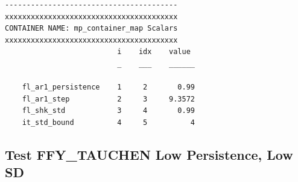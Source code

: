 \documentclass[
]{book}
\begin{document}
\begin{verbatim}
----------------------------------------
xxxxxxxxxxxxxxxxxxxxxxxxxxxxxxxxxxxxxxxx
CONTAINER NAME: mp_container_map Scalars
xxxxxxxxxxxxxxxxxxxxxxxxxxxxxxxxxxxxxxxx
                          i    idx    value 
                          _    ___    ______

    fl_ar1_persistence    1     2       0.99
    fl_ar1_step           2     3     9.3572
    fl_shk_std            3     4       0.99
    it_std_bound          4     5          4
\end{verbatim}

\hypertarget{test-ffy_tauchen-low-persistence-low-sd-1}{%
\subsection{Test FFY\_TAUCHEN Low Persistence, Low SD}\label{test-ffy_tauchen-low-persistence-low-sd-1}}
\end{document}
